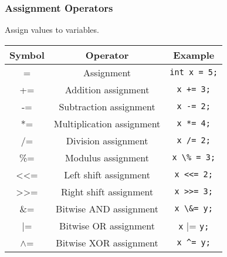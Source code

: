 \documentclass[11pt,A4]{article}
\begin{document}
            \subsubsection{Assignment Operators}
            Assign values to variables.
            \begin{table}[h]
                \centering
                \setlength{\arrayrulewidth}{0.3mm}
                \renewcommand{\arraystretch}{1.2}
                \begin{tabular}{ccc}
                    \toprule
                    Symbol & Operator & Example \\
                    \midrule
                    = & Assignment & \verb|int x = 5;| \\
                    \arrayrulecolor{gray!50}\cmidrule(lr){1-3}\arrayrulecolor{black}
                    += & Addition assignment & \verb|x += 3;| \\
                    \arrayrulecolor{gray!50}\cmidrule(lr){1-3}\arrayrulecolor{black}
                    -= & Subtraction assignment & \verb|x -= 2;| \\
                    \arrayrulecolor{gray!50}\cmidrule(lr){1-3}\arrayrulecolor{black}
                    *= & Multiplication assignment & \verb|x *= 4;| \\
                    \arrayrulecolor{gray!50}\cmidrule(lr){1-3}\arrayrulecolor{black}
                    /= & Division assignment & \verb|x /= 2;| \\
                    \arrayrulecolor{gray!50}\cmidrule(lr){1-3}\arrayrulecolor{black}
                    \%= & Modulus assignment & \verb|x \% = 3;| \\
                    \arrayrulecolor{gray!50}\cmidrule(lr){1-3}\arrayrulecolor{black}
                    <<= & Left shift assignment & \verb|x <<= 2;| \\
                    \arrayrulecolor{gray!50}\cmidrule(lr){1-3}\arrayrulecolor{black}
                    >>= & Right shift assignment & \verb|x >>= 3;| \\
                    \arrayrulecolor{gray!50}\cmidrule(lr){1-3}\arrayrulecolor{black}
                    \&= & Bitwise AND assignment & \verb|x \&= y;| \\
                    \arrayrulecolor{gray!50}\cmidrule(lr){1-3}\arrayrulecolor{black}
                    |= & Bitwise OR assignment & \verb|x| |= \verb|y;| \\
                    \arrayrulecolor{gray!50}\cmidrule(lr){1-3}\arrayrulecolor{black}
                    $\wedge$= & Bitwise XOR assignment & \verb|x ^= y;| \\
                    \bottomrule
                \end{tabular}
            \end{table}
\end{document}
